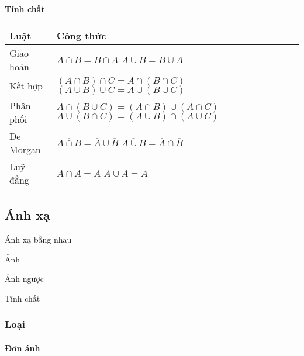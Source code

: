 \documentclass[11pt]{article}
\begin{document}
    \paragraph{Tính chất}\label{tuxednh-chux1ea5t}

    {\def\LTcaptype{none} %
\begin{longtable}[]{@{}
  >{\raggedright\arraybackslash}p{}
  >{\raggedright\arraybackslash}p{}@{}}
\toprule\noalign{}
\begin{minipage}[b]{\linewidth}\raggedright
\textbf{Luật}
\end{minipage} & \begin{minipage}[b]{\linewidth}\raggedright
\textbf{Công thức}
\end{minipage} \\
\midrule\noalign{}
\endhead
\bottomrule\noalign{}
\endlastfoot
Giao hoán & \(A \cap B = B \cap A\) \(A \cup B = B \cup A\) \\
Kết hợp & \((A \cap B) \cap C = A \cap (B \cap C)\)
\((A \cup B) \cup C = A \cup (B \cup C)\) \\
Phân phối & \(A \cap (B \cup C) = (A \cap B) \cup (A \cap C)\)
\(A \cup (B \cap C) = (A \cup B) \cap (A \cup C)\) \\
De Morgan & \(\overline{A \cap B} = \overline{A} \cup \overline{B}\)
\(\overline{A \cup B} = \overline{A} \cap \overline{B}\) \\
Luỹ đẳng & \(A \cap A = A\) \(A \cup A = A\) \\
\end{longtable}
}

    \subsection{Ánh xạ}\label{uxe1nh-xux1ea1}

    Ánh xạ bằng nhau

Ảnh

Ảnh ngược

Tính chất

    \subsubsection{Loại}\label{loux1ea1i}

    \paragraph{Đơn ánh}\label{ux111ux1a1n-uxe1nh}
\end{document}
